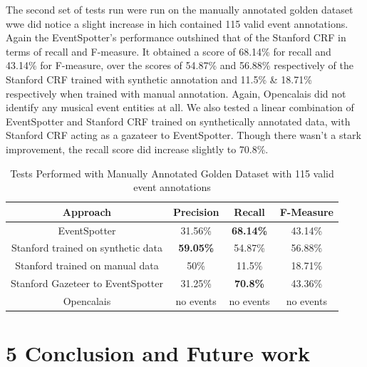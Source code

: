 \documentclass[a4paper,11pt]{report}
\begin{document}
The second set of tests run were run on the manually annotated golden dataset wwe did notice a slight increase in hich contained 115 valid event annotations. Again the EventSpotter's performance outshined that of the Stanford CRF in terms of recall and F-measure. It obtained a score of 68.14\% for recall and 43.14\% for F-measure, over the scores of 54.87\% and 56.88\% respectively of the Stanford CRF trained with synthetic annotation and 11.5\% & 18.71\% respectively when trained with manual annotation. Again, Opencalais did not identify any musical event entities at all. We also tested a linear combination of EventSpotter and Stanford CRF trained on synthetically annotated data, with Stanford CRF acting as a gazateer to EventSpotter. Though there wasn't a stark improvement, the recall score did increase slightly to 70.8\%.
\begin{table}
\caption{Tests Performed with Manually Annotated Golden Dataset with 115 valid event annotations} %
\centering %
\begin{tabular}{c c c c} %
\hline\hline %
Approach & Precision & Recall & F-Measure \\ [0.5ex] %
\hline %
EventSpotter & 31.56\% & \bf 68.14\% \bf & 43.14\% \\
Stanford trained on synthetic data & \bf 59.05\% \bf & 54.87\% & 56.88\%\\
Stanford trained on manual data & 50\% & 11.5\% & 18.71\% \\
Stanford Gazeteer to EventSpotter & 31.25\% & \bf 70.8\% \bf & 43.36\% \\
Opencalais & no events & no events & no events \\
\hline %
\end{tabular}
\label{table:nonlin} %
\end{table}

\chapter*{5 Conclusion and Future work}
\end{document}
